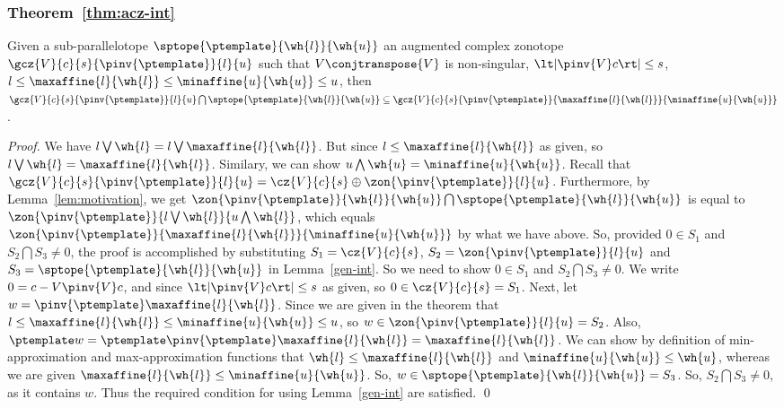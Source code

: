 \subsubsection*{Theorem~\ref{thm:acz-int}}
Given a sub-parallelotope $\sptope{\ptemplate}{\wh{l}}{\wh{u}}$ an
augmented complex zonotope $\gcz{V}{c}{s}{\pinv{\ptemplate}}{l}{u}$
such that $V\conjtranspose{V}$ is non-singular, $\lt|\pinv{V}c\rt|\leq s$, $l\leq
\maxaffine{l}{\wh{l}}\leq \minaffine{u}{\wh{u}}\leq u$, then
$\gcz{V}{c}{s}{\pinv{\ptemplate}}{l}{u}\bigcap\sptope{\ptemplate}{\wh{l}}{\wh{u}}\subseteq
\gcz{V}{c}{s}{\pinv{\ptemplate}}{\maxaffine{l}{\wh{l}}}{\minaffine{u}{\wh{u}}}$.
%
\begin{proof}
  We have $l\bigvee\wh{l} = l\bigvee \maxaffine{l}{\wh{l}}$.  But
  since $l\leq \maxaffine{l}{\wh{l}}$ as given, so
  $l\bigvee\wh{l}=\maxaffine{l}{\wh{l}}$. Similary, we can show
  $u\bigwedge \wh{u}=\minaffine{u}{\wh{u}}$.  Recall that
  $\gcz{V}{c}{s}{\pinv{\ptemplate}}{l}{u}=\cz{V}{c}{s}\oplus\zon{\pinv{\ptemplate}}{l}{u}$.
  Furthermore, by Lemma~\ref{lem:motivation}, we get
  $\zon{\pinv{\ptemplate}}{\wh{l}}{\wh{u}}\bigcap\sptope{\ptemplate}{\wh{l}}{\wh{u}}$
  is equal to
  $\zon{\pinv{\ptemplate}}{l\bigvee\wh{l}}{u\bigwedge{\wh{l}}}$, which
  equals
  $\zon{\pinv{\ptemplate}}{\maxaffine{l}{\wh{l}}}{\minaffine{u}{\wh{u}}}$
  by what we have above.  So, provided $0\in S_1$ and $S_2\bigcap
  S_3\neq 0$, the proof is accomplished by substituting
  $S_1=\cz{V}{c}{s}$, $S_2=\zon{\pinv{\ptemplate}}{l}{u}$ and
  $S_3=\sptope{\ptemplate}{\wh{l}}{\wh{u}}$ in Lemma~\ref{gen-int}.
  So we need to show $0\in S_1$ and $S_2\bigcap S_3\neq 0$.  We write
  $0 = c-V\pinv{V}c$, and since $\lt|\pinv{V}c\rt|\leq s$ as given, so
  $0\in \cz{V}{c}{s}=S_1$.  Next, let
  $w=\pinv{\ptemplate}\maxaffine{l}{\wh{l}}$.  Since we are given in
  the theorem that
  $l\leq \maxaffine{l}{\wh{l}}\leq \minaffine{u}{\wh{u}}\leq u$, so
  $w\in\zon{\pinv{\ptemplate}}{l}{u}= S_2$.  Also, $\ptemplate
  w=\ptemplate\pinv{\ptemplate}\maxaffine{l}{\wh{l}}
  = \maxaffine{l}{\wh{l}}$.   We can show by definition of min-approximation and max-approximation functions that
  $\wh{l}\leq \maxaffine{l}{\wh{l}}$ and  $\minaffine{u}{\wh{u}}\leq \wh{u}$, whereas we are given $\maxaffine{l}{\wh{l}}\leq \minaffine{u}{\wh{u}}$.  So,
  $w\in \sptope{\ptemplate}{\wh{l}}{\wh{u}}=S_3$.  So, $S_2\bigcap
  S_3\neq 0$, as it contains $w$.  Thus the required condition for
  using Lemma~\ref{gen-int} are satisfied. \qed
\end{proof}

